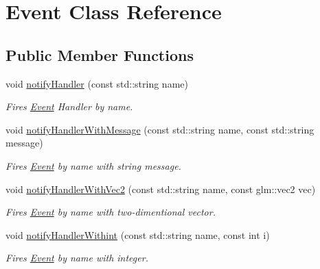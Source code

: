 \hypertarget{class_event}{}\section{Event Class Reference}
\label{class_event}
\subsection*{Public Member Functions}
\begin{DoxyCompactItemize}
\item 
\mbox{\label{class_event_a144119cf594d4a6f6c2bf77811f223e3}} 
void \mbox{\hyperlink{class_event_a144119cf594d4a6f6c2bf77811f223e3}{notify\+Handler}} (const std\+::string name)
\begin{DoxyCompactList}\small\item\em Fires \mbox{\hyperlink{class_event}{Event}} Handler by name. \end{DoxyCompactList}\item 
\mbox{\label{class_event_aff88b52545b4bd41eb1e7c148acfa3c9}} 
void \mbox{\hyperlink{class_event_aff88b52545b4bd41eb1e7c148acfa3c9}{notify\+Handler\+With\+Message}} (const std\+::string name, const std\+::string message)
\begin{DoxyCompactList}\small\item\em Fires \mbox{\hyperlink{class_event}{Event}} by name with string message. \end{DoxyCompactList}\item 
\mbox{\label{class_event_a0521173a49e2c86e5d56aed25872114c}} 
void \mbox{\hyperlink{class_event_a0521173a49e2c86e5d56aed25872114c}{notify\+Handler\+With\+Vec2}} (const std\+::string name, const glm\+::vec2 vec)
\begin{DoxyCompactList}\small\item\em Fires \mbox{\hyperlink{class_event}{Event}} by name with two-\/dimentional vector. \end{DoxyCompactList}\item 
\mbox{\label{class_event_a9116b6d26e9d489b652d96d25caeea4d}} 
void \mbox{\hyperlink{class_event_a9116b6d26e9d489b652d96d25caeea4d}{notify\+Handler\+Withint}} (const std\+::string name, const int i)
\begin{DoxyCompactList}\small\item\em Fires \mbox{\hyperlink{class_event}{Event}} by name with integer. \end{DoxyCompactList}\item 

\end{DoxyCompactItemize}
